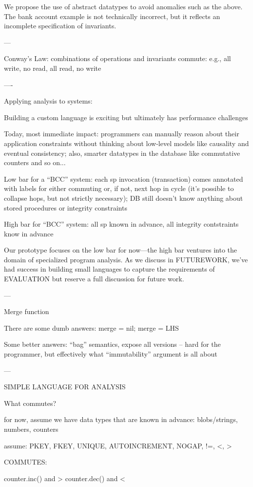 We propose the use of abstract datatypes to avoid anomalies such as
the above. The bank account example is not technically incorrect, but
it reflects an incomplete specification of invariants.

---

Conway's Law: combinations of operations and invariants commute: e.g., all write, no read, all read, no write

----

Applying analysis to systems:

Building a custom language is exciting but ultimately has performance challenges

Today, most immediate impact: programmers can manually reason about their application constraints without thinking about low-level models like causality and eventual consistency; also, smarter datatypes in the database like commutative counters and so on...

Low bar for a ``BCC'' system: each sp invocation (transaction) comes annotated with labels for either commuting or, if not, next hop in cycle (it's possible to collapse hops, but not strictly necessary); DB still doesn't know anything about stored procedures or integrity constraints

High bar for ``BCC'' system: all sp known in advance, all integrity contstraints know in advance

Our prototype focuses on the low bar for now---the high bar ventures into the domain of specialized program analysis. As we discuss in FUTUREWORK, we've had success in building small languages to capture the requirements of EVALUATION but reserve a full discussion for future work.

---

Merge function

There are some dumb answers: merge = nil; merge = LHS

Some better answers:
``bag'' semantics, expose all versions -- hard for the programmer, but effectively what ``immutability'' argument is all about

---

SIMPLE LANGUAGE FOR ANALYSIS

What commutes?

for now, assume we have data types that are known in advance: blobs/strings, numbers, counters

assume: PKEY, FKEY, UNIQUE, AUTOINCREMENT, NOGAP, !=, <, >

COMMUTES: 

counter.inc() and >
counter.dec() and <

